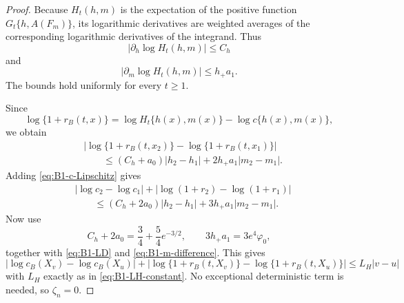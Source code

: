 \begin{proof}
Because \(H_t(h,m)\) is the expectation of the positive
function \(G_t\{h,A(F_m)\}\), its logarithmic derivatives are
weighted averages of the corresponding logarithmic derivatives
of the integrand. Thus
\begin{equation}
 |\partial_h\log H_t(h,m)|\le C_h
 \label{eq:B1-H-h-derivative}
\end{equation}
and
\begin{equation}
 |\partial_m\log H_t(h,m)|
 \le h_+a_1.
 \label{eq:B1-H-m-derivative}
\end{equation}
The bounds hold uniformly for every \(t\ge1\).

Since
\[
 \log\{1+r_B(t,x)\}
 =
 \log H_t\{h(x),m(x)\}
 -\log c\{h(x),m(x)\},
\]
we obtain
\begin{align}
 &|\log\{1+r_B(t,x_2)\}
   -\log\{1+r_B(t,x_1)\}|
 \nonumber\\
 &\qquad\le
 (C_h+a_0)|h_2-h_1|
 +2h_+a_1|m_2-m_1|.
 \label{eq:B1-r-Lipschitz}
\end{align}
Adding \eqref{eq:B1-c-Lipschitz} gives
\begin{align}
 &|\log c_2-\log c_1|
 +|\log(1+r_2)-\log(1+r_1)|
 \nonumber\\
 &\qquad\le
 (C_h+2a_0)|h_2-h_1|
 +3h_+a_1|m_2-m_1|.
 \label{eq:B1-combined-Lipschitz}
\end{align}
Now use
\[
 C_h+2a_0
 =
 \frac34+\frac54e^{-3/2},
 \qquad
 3h_+a_1
 =
 3e^4\varphi_0,
\]
together with \eqref{eq:B1-LD} and
\eqref{eq:B1-m-difference}. This gives
\[
 |\log c_B(X_v)-\log c_B(X_u)|
 +
 |\log\{1+r_B(t,X_v)\}
  -\log\{1+r_B(t,X_u)\}|
 \le L_H|v-u|
\]
with \(L_H\) exactly as in
\eqref{eq:B1-LH-constant}. No exceptional deterministic term is
needed, so \(\zeta_n=0\).
\end{proof}


